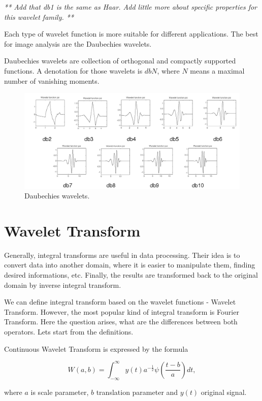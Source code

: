 \textit{** Add that db1 is the same as Haar. Add little more about specific properties for this wavelet family. **}

Each type of wavelet function is more suitable for different applications. The best for image analysis are the Daubechies wavelets. 

\begin{defn}
Daubechies wavelets are collection of orthogonal and compactly supported functions. A denotation for those wavelets is $dbN$, where $N$ means a maximal number of vanishing moments.
\end{defn}

\begin{figure}[h]
	\centering
	\includegraphics[width=\textwidth]{DB_N.png}
	\caption{Daubechies wavelets.}
	\label{fig:db_wavelets}
\end{figure}

\section{Wavelet Transform}

Generally, integral transforms are useful in data processing. Their idea is to convert data into another domain, where it is easier to manipulate them, finding desired informations, etc. Finally, the results are transformed back to the original domain by inverse integral transform.

We can define integral transform based on the wavelet functions - Wavelet Transform.
However, the most popular kind of integral transform is Fourier Transform. Here the question arises, what are the differences between both operators. Lets start from the definitions.

\begin{defn}
Continuous Wavelet Transform is expressed by the formula

\begin{equation}
W(a,b)=\int_{-\infty}^{\infty} y(t) a^{-\frac{1}{2}} \psi\left(\frac{t-b}{a}\right) dt,
\end{equation}

where $a$ is scale parameter, $b$ translation parameter and $y(t)$ original signal.
\end{defn}


